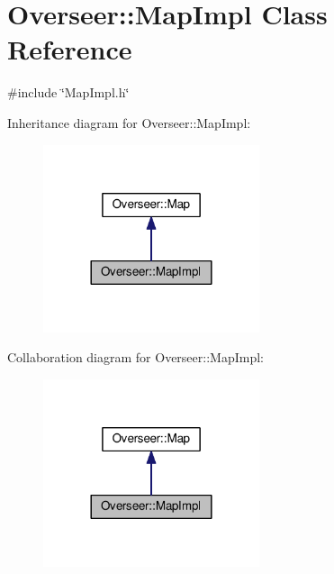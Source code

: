 \hypertarget{classOverseer_1_1MapImpl}{}\section{Overseer\+:\+:Map\+Impl Class Reference}
\label{classOverseer_1_1MapImpl}


{\ttfamily \#include \char`\"{}Map\+Impl.\+h\char`\"{}}



Inheritance diagram for Overseer\+:\+:Map\+Impl\+:
\nopagebreak
\begin{figure}[H]
\begin{center}
\leavevmode
\includegraphics[width=180pt]{classOverseer_1_1MapImpl__inherit__graph}
\end{center}
\end{figure}


Collaboration diagram for Overseer\+:\+:Map\+Impl\+:
\nopagebreak
\begin{figure}[H]
\begin{center}
\leavevmode
\includegraphics[width=180pt]{classOverseer_1_1MapImpl__coll__graph}
\end{center}
\end{figure}
